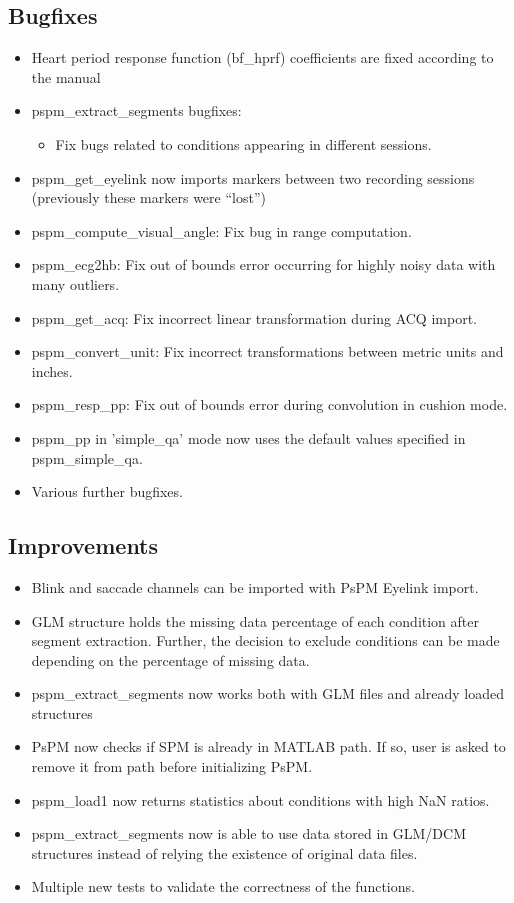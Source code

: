 \documentclass[english]{article}
\numberwithin{equation}{section}
\numberwithin{figure}{section}
\begin{document}
\subsection*{Bugfixes}
\begin{itemize}
\item Heart period response function (bf\_hprf) coefficients are fixed according
to the manual
\item pspm\_extract\_segments bugfixes:
\begin{itemize}
\item Fix bugs related to conditions appearing in different sessions.
\end{itemize}
\item pspm\_get\_eyelink now imports markers between two recording sessions
(previously these markers were ``lost'')
\item pspm\_compute\_visual\_angle: Fix bug in range computation.
\item pspm\_ecg2hb: Fix out of bounds error occurring for highly noisy data
with many outliers.
\item pspm\_get\_acq: Fix incorrect linear transformation during ACQ import.
\item pspm\_convert\_unit: Fix incorrect transformations between metric
units and inches.
\item pspm\_resp\_pp: Fix out of bounds error during convolution in cushion
mode.
\item pspm\_pp in 'simple\_qa' mode now uses the default values specified
in pspm\_simple\_qa.
\item Various further bugfixes.
\end{itemize}

\subsection*{Improvements}
\begin{itemize}
\item Blink and saccade channels can be imported with PsPM Eyelink import.
\item GLM structure holds the missing data percentage of each condition
after segment extraction. Further, the decision to exclude conditions
can be made depending on the percentage of missing data.
\item pspm\_extract\_segments now works both with GLM files and already
loaded structures
\item PsPM now checks if SPM is already in MATLAB path. If so, user is asked
to remove it from path before initializing PsPM.
\item pspm\_load1 now returns statistics about conditions with high NaN
ratios.
\item pspm\_extract\_segments now is able to use data stored in GLM/DCM
structures instead of relying the existence of original data files.
\item Multiple new tests to validate the correctness of the functions.
\end{itemize}
\end{document}
